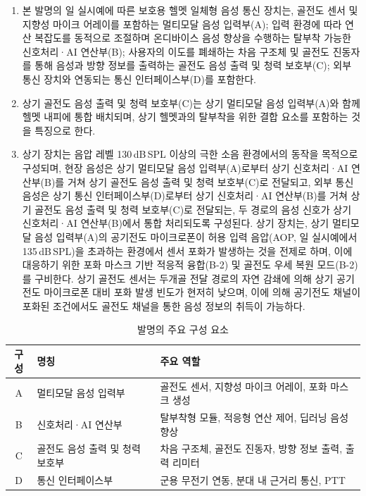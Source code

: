 \documentclass{article}
\begin{document}
\begin{enumerate}[label = \textbf{(S.\arabic*)}]

    \item 본 발명의 일 실시예에 따른 보호용 헬멧 일체형 음성 통신 장치는,
    골전도 센서 및 지향성 마이크 어레이를 포함하는 멀티모달 음성 입력부(A);
    입력 환경에 따라 연산 복잡도를 동적으로 조절하며 온디바이스 음성 향상을 수행하는 탈부착 가능한 신호처리·AI 연산부(B);
    사용자의 이도를 폐쇄하는 차음 구조체 및 골전도 진동자를 통해 음성과 방향 정보를 출력하는 골전도 음성 출력 및 청력 보호부(C);
    외부 통신 장치와 연동되는 통신 인터페이스부(D)를 포함한다.

    \item 상기 골전도 음성 출력 및 청력 보호부(C)는 상기 멀티모달
    음성 입력부(A)와 함께 헬멧 내피에 통합 배치되며, 상기 헬멧과의
    탈부착을 위한 결합 요소를 포함하는 것을 특징으로 한다.

    \item 상기 장치는 음압 레벨 130\,dB\,SPL 이상의 극한 소음 환경에서의 동작을 목적으로 구성되며, 현장 음성은 상기 멀티모달 음성 입력부(A)로부터 상기 신호처리·AI 연산부(B)를 거쳐 상기 골전도 음성 출력 및 청력 보호부(C)로 전달되고, 외부 통신 음성은 상기 통신 인터페이스부(D)로부터 상기 신호처리·AI 연산부(B)를 거쳐 상기 골전도 음성 출력 및 청력 보호부(C)로 전달되는, 두 경로의 음성 신호가 상기 신호처리·AI 연산부(B)에서 통합 처리되도록 구성된다. 상기 장치는, 상기 멀티모달 음성 입력부(A)의 공기전도 마이크로폰이 허용 입력 음압(AOP, 일 실시예에서 135\,dB\,SPL)을 초과하는 환경에서 센서 포화가 발생하는 것을 전제로 하며, 이에 대응하기 위한 포화 마스크 기반 적응적 융합(B-2) 및 골전도 우세 복원 모드(B-2)를 구비한다. 상기 골전도 센서는 두개골 전달 경로의 자연 감쇄에 의해 상기 공기전도 마이크로폰 대비 포화 발생 빈도가 현저히 낮으며, 이에 의해 공기전도 채널이 포화된 조건에서도 골전도 채널을 통한 음성 정보의 취득이 가능하다.
\end{enumerate}


\begin{table}[!h]
    \centering
    \begin{tabular}{c|l|l}
        \hline
        구성 & 명칭 & 주요 역할 \\
        \hline\hline
        A & 멀티모달 음성 입력부
          & 골전도 센서, 지향성 마이크 어레이, 포화 마스크 생성 \\
        B & 신호처리·AI 연산부
          & 탈부착형 모듈, 적응형 연산 제어, 딥러닝 음성 향상 \\
        C & 골전도 음성 출력 및 청력 보호부
          & 차음 구조체, 골전도 진동자, 방향 정보 출력, 출력 리미터 \\
        D & 통신 인터페이스부
          & 군용 무전기 연동, 분대 내 근거리 통신, PTT \\
        \hline
    \end{tabular}
    \caption{발명의 주요 구성 요소}
    \label{tab:components}
\end{table}
\end{document}
